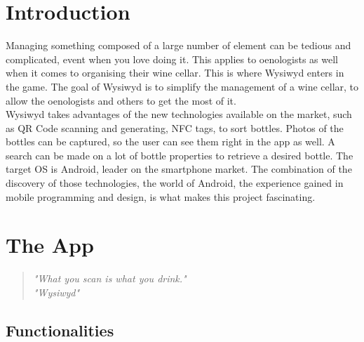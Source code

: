  

\thispagestyle{empty}

\titleTH %

\newpage

\tableofcontents

\newpage


\section{Introduction}

Managing something composed of a large number of element can be tedious and complicated, event when you love doing it. This applies to oenologists as well when it comes to organising their wine cellar. This is where Wysiwyd enters in the game. The goal of Wysiwyd is to simplify the management of a wine cellar, to allow the oenologists and others to get the most of it.\\

Wysiwyd takes advantages of the new technologies available on the market, such as QR Code scanning and generating, NFC tags, to sort bottles. Photos of the bottles can be captured, so the user can see them right in the app as well. A search can be made on a lot of bottle properties to retrieve a desired bottle. The target OS is Android, leader on the smartphone market. The combination of the discovery of those technologies, the world of Android, the experience gained in mobile programming and design, is what makes this project fascinating.


\section{The App}

\begin{quotation}
\center \emph{"What you scan is what you drink."\\ "Wysiwyd"}
\end{quotation}

\subsection{Functionalities}

